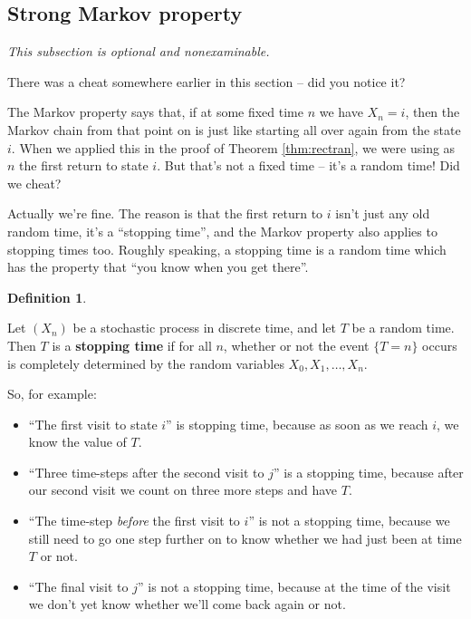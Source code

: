 \documentclass[
  a4paper,
]{article}
\providecommand{\tightlist}{%
  \setlength{\itemsep}{0pt}\setlength{\parskip}{0pt}}
\theoremstyle{definition}
\newtheorem{definition}{Definition}[section]
\theoremstyle{definition}
\theoremstyle{definition}
\theoremstyle{remark}
\begin{document}
\hypertarget{S09-strong-markov}{%
\subsection{Strong Markov property}\label{S09-strong-markov}}

\emph{This subsection is optional and nonexaminable.}

There was a cheat somewhere earlier in this section -- did you notice it?

The Markov property says that, if at some fixed time \(n\) we have \(X_n = i\), then the Markov chain from that point on is just like starting all over again from the state \(i\). When we applied this in the proof of Theorem \ref{thm:rectran}, we were using as \(n\) the first return to state \(i\). But that's not a fixed time -- it's a random time! Did we cheat?

Actually we're fine. The reason is that the first return to \(i\) isn't just any old random time, it's a ``stopping time'', and the Markov property also applies to stopping times too. Roughly speaking, a stopping time is a random time which has the property that ``you know when you get there''.

\begin{definition}
\protect\hypertarget{def:stopping}{}\label{def:stopping}

Let \((X_n)\) be a stochastic process in discrete time, and let \(T\) be a random time. Then \(T\) is a \textbf{stopping time} if for all \(n\), whether or not the event \(\{T = n\}\) occurs is completely determined by the random variables \(X_0, X_1, \dots, X_n\).

\end{definition}

So, for example:

\begin{itemize}
\tightlist
\item
  ``The first visit to state \(i\)'' is stopping time, because as soon as we reach \(i\), we know the value of \(T\).
\item
  ``Three time-steps after the second visit to \(j\)'' is a stopping time, because after our second visit we count on three more steps and have \(T\).
\item
  ``The time-step \emph{before} the first visit to \(i\)'' is not a stopping time, because we still need to go one step further on to know whether we had just been at time \(T\) or not.
\item
  ``The final visit to \(j\)'' is not a stopping time, because at the time of the visit we don't yet know whether we'll come back again or not.
\end{itemize}
\end{document}
